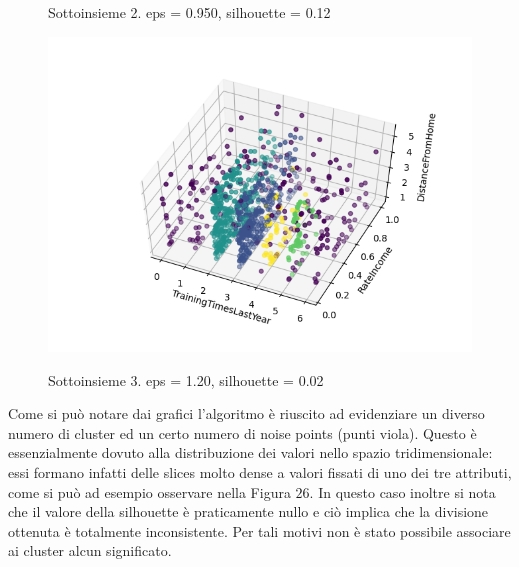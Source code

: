 \documentclass[a4paper,9pt]{article}
\begin{document}
\begin{figure}[H]
\begin{minipage}[b]{0.45\textwidth}
\caption{Sottoinsieme 2. eps = 0.950, silhouette = 0.12 }
\label{etichetta2}
\centering
\includegraphics[width=\textwidth]{5 (2).png}
\caption{Sottoinsieme 3. eps = 1.20, silhouette = 0.02}
\label{etichetta2}
\end{minipage}
\end{figure}

Come si può notare dai grafici l'algoritmo è riuscito ad evidenziare un diverso numero di cluster ed un certo numero di noise points (punti viola). Questo è essenzialmente dovuto alla distribuzione dei valori nello spazio tridimensionale: essi formano infatti delle slices molto dense a valori fissati di uno dei tre attributi, come si può ad esempio osservare nella Figura $26$. In questo caso inoltre si nota che il valore della silhouette è praticamente nullo e ciò implica che la divisione ottenuta è totalmente inconsistente. Per tali motivi non è stato possibile associare ai cluster alcun significato.
\end{document}
